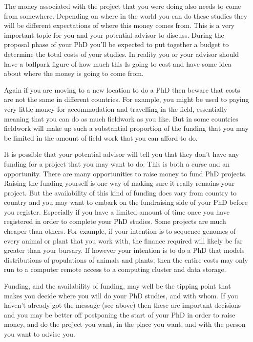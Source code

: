 \documentclass[
]{krantz}
\begin{document}
The money associated with the project that you were doing also needs to come from somewhere. Depending on where in the world you can do these studies they will be different expectations of where this money comes from. This is a very important topic for you and your potential advisor to discuss. During the proposal phase of your PhD you'll be expected to put together a budget to determine the total costs of your studies. In reality you or your advisor should have a ballpark figure of how much this Is going to cost and have some idea about where the money is going to come from.

Again if you are moving to a new location to do a PhD then beware that costs are not the same in different countries. For example, you might be used to paying very little money for accommodation and travelling in the field, essentially meaning that you can do as much fieldwork as you like. But in some countries fieldwork will make up such a substantial proportion of the funding that you may be limited in the amount of field work that you can afford to do.

It is possible that your potential advisor will tell you that they don't have any funding for a project that you may want to do. This is both a curse and an opportunity. There are many opportunities to raise money to fund PhD projects. Raising the funding yourself is one way of making sure it really remains your project. But the availability of this kind of funding does vary from country to country and you may want to embark on the fundraising side of your PhD before you register. Especially if you have a limited amount of time once you have registered in order to complete your PhD studies.
Some projects are much cheaper than others. For example, if your intention is to sequence genomes of every animal or plant that you work with, the finance required will likely be far greater than your bursary. If however your intention is to do a PhD that models distributions of populations of animals and plants, then the entire costs may only run to a computer remote access to a computing cluster and data storage.

Funding, and the availability of funding, may well be the tipping point that makes you decide where you will do your PhD studies, and with whom. If you haven't already got the message (see above) then these are important decisions and you may be better off postponing the start of your PhD in order to raise money, and do the project you want, in the place you want, and with the person you want to advise you.
\end{document}
